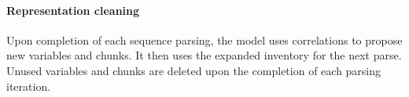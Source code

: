 \documentclass{article} %
\theoremstyle{remark}
\begin{document}
\paragraph{Representation cleaning} Upon completion of each sequence parsing, the model uses correlations to propose new variables and chunks. It then uses the expanded inventory for the next parse. Unused variables and chunks are deleted upon the completion of each parsing iteration. 



\end{document}

